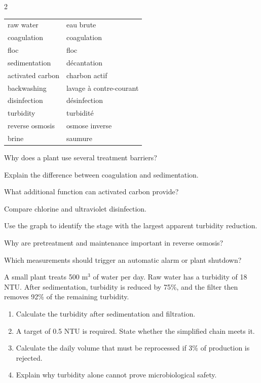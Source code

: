 \begin{multicols}{2}
\begin{vocabulary}
\begin{tabularx}{\linewidth}{@{}lX@{}}
raw water & eau brute\\
coagulation & coagulation\\
floc & floc\\
sedimentation & décantation\\
activated carbon & charbon actif\\
backwashing & lavage à contre-courant\\
disinfection & désinfection\\
turbidity & turbidité\\
reverse osmosis & osmose inverse\\
brine & saumure
\end{tabularx}
\end{vocabulary}

\begin{questions}
\item Why does a plant use several treatment barriers?
\item Explain the difference between coagulation and sedimentation.
\item What additional function can activated carbon provide?
\item Compare chlorine and ultraviolet disinfection.
\item Use the graph to identify the stage with the largest apparent turbidity reduction.
\item Why are pretreatment and maintenance important in reverse osmosis?
\item Which measurements should trigger an automatic alarm or plant shutdown?
\end{questions}

\begin{applicationexercise}
A small plant treats 500 m$^3$ of water per day. Raw water has a turbidity of 18 NTU. After
sedimentation, turbidity is reduced by 75\%, and the filter then removes 92\% of the remaining
turbidity.
\begin{enumerate}
\item Calculate the turbidity after sedimentation and filtration.
\item A target of 0.5 NTU is required. State whether the simplified chain meets it.
\item Calculate the daily volume that must be reprocessed if 3\% of production is rejected.
\item Explain why turbidity alone cannot prove microbiological safety.
\end{enumerate}
\end{applicationexercise}


\end{multicols}
